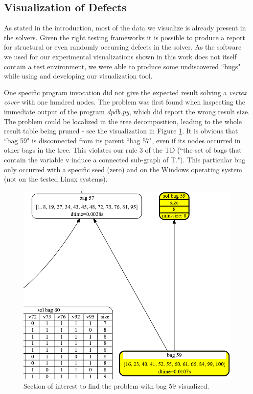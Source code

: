 \documentclass[a4paper, 12pt, bibliography=totoc]{scrartcl}
\begin{document}
\subsection{Visualization of Defects}
 
As stated in the introduction, most of the data we visualize is already present in the solvers.
Given the right testing frameworks it is possible to produce a report for structural or even randomly occurring defects in the solver. As the software we used for our experimental visualizations shown in this work does not itself contain a test environment, we were able to produce some undiscovered ``bugs" while using and developing our visualization tool.


 One specific program invocation did not give the expected result solving a \textit{vertex cover} with one hundred nodes. The problem was first found when inspecting the immediate output of the program \textit{dpdb.py}, which did report the wrong result size. The problem could be localized in the tree decomposition, leading to the whole result table being pruned - see the visualization in Figure \ref{fig:starsbag59}. It is obvious that ``bag 59" is disconnected from its parent ``bag 57", even if its nodes occurred in other bags in the tree. This violates our rule $3$ of the TD (``the set of bags that contain the variable v induce a connected sub-graph of T.").  This particular bug only occurred  with a specific seed (zero) and on the Windows operating system (not on the tested Linux systems). 

\begin{figure}
	\centering
	\vspace{1em}
	\includegraphics[width=0.8\linewidth,height=0.9\textheight,keepaspectratio
					]{images/starsbag59.png}
		\vspace{1em}
	\caption[Section of interest to find the problem with bag 59 visualized]{Section of interest to find the problem with bag 59 visualized.}
	\label{fig:starsbag59}
\end{figure}
\end{document}
